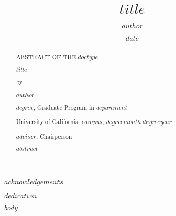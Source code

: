 \documentclass[12pt,oneside]{ucrthesis}
\title{$title$}
\author{$author$}
\date{$date$}
\begin{document}
\maketitle

\frontmatter

\begin{acknowledgements}
  $acknowledgements$
\end{acknowledgements}

\begin{dedication}
  \begin{center}
    \null\vfil
    $dedication$
    \null\vfil
  \end{center}
\end{dedication}


\begin{abstract}
  \begin{center}
  \begin{singlespace}
    ABSTRACT OF THE \expandafter\uppercase\expandafter{$doctype$}\par
    \vspace{.5in}
    $title$\par
    \vspace{.25in}
    by\par
    \vspace{.25in}
    $author$\par
    \vspace{.25in}
    $degree$, Graduate Program in $department$\par
    University of California, $campus$, $degreemonth$ $degreeyear$\par
    $advisor$, Chairperson\par
    \vspace{.25in}
  \end{singlespace}
  \end{center}
      $abstract$
\end{abstract}


\hypersetup{linkcolor=$if(toccolor)$$toccolor$$else$black$endif$}
\setcounter{secnumdepth}{$toc-depth$}
\setcounter{tocdepth}{$toc-depth$}

\tableofcontents

\cleardoublepage
{}
\listoffigures

\cleardoublepage
{}
\listoftables


\mainmatter %
\pagestyle{fancyplain} %

$body$


\end{document}
